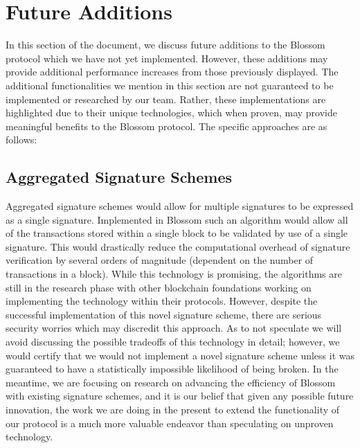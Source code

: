 \section{Future Additions}\label{future}

In this section of the document, we discuss future additions to the Blossom protocol which we have not yet implemented. However, these additions may provide additional performance increases from those previously displayed. The additional functionalities we mention in this section are not guaranteed to be implemented or researched by our team. Rather, these implementations are highlighted due to their unique technologies, which when proven, may provide meaningful benefits to the Blossom protocol. The specific approaches are as follows:

\subsection{Aggregated Signature Schemes}
Aggregated signature schemes would allow for multiple signatures to be expressed as a single signature. Implemented in Blossom such an algorithm would allow all of the transactions stored within a single block to be validated by use of a single signature. This would drastically reduce the computational overhead of signature verification by several orders of magnitude (dependent on the number of transactions in a block). While this technology is promising, the algorithms are still in the research phase with other blockchain foundations working on implementing the technology within their protocols. However, despite the successful implementation of this novel signature scheme, there are serious security worries which may discredit this approach. As to not speculate we will avoid discussing the possible tradeoffs of this technology in detail; however, we would certify that we would not implement a novel signature scheme unless it was guaranteed to have a statistically impossible likelihood of being broken. In the meantime, we are focusing on research on advancing the efficiency of Blossom with existing signature schemes, and it is our belief that given any possible future innovation, the work we are doing in the present to extend the functionality of our protocol is a much more valuable endeavor than speculating on unproven technology.

